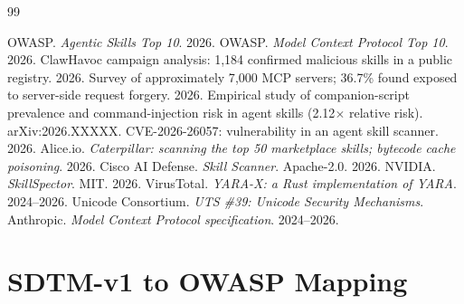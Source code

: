 \documentclass[11pt]{article}
\begin{document}
\begin{thebibliography}{99}

 OWASP. \emph{Agentic Skills Top 10}. 2026.
 OWASP. \emph{Model Context Protocol Top 10}. 2026.
 ClawHavoc campaign analysis: 1{,}184 confirmed malicious skills in a public registry. 2026.
 Survey of approximately 7{,}000 MCP servers; 36.7\% found exposed to server-side request forgery. 2026.
 Empirical study of companion-script prevalence and command-injection risk in agent skills (2.12$\times$ relative risk). arXiv:2026.XXXXX.
 CVE-2026-26057: vulnerability in an agent skill scanner. 2026.
 Alice.io. \emph{Caterpillar: scanning the top 50 marketplace skills; bytecode cache poisoning}. 2026.
 Cisco AI Defense. \emph{Skill Scanner}. Apache-2.0. 2026.
 NVIDIA. \emph{SkillSpector}. MIT. 2026.
 VirusTotal. \emph{YARA-X: a Rust implementation of YARA}. 2024--2026.
 Unicode Consortium. \emph{UTS \#39: Unicode Security Mechanisms}.
 Anthropic. \emph{Model Context Protocol specification}. 2024--2026.

\end{thebibliography}

\appendix

\section{SDTM-v1 to OWASP Mapping}
\end{document}
